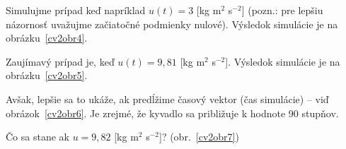 \documentclass[a4paper, 10pt, ]{article}
\begin{document}
\bigskip

\noindent
Simulujme prípad keď napríklad $u(t) = 3$ [kg m$^2$ s$^{-2}$] (pozn.: pre lepšiu názornosť uvažujme začiatočné podmienky nulové). Výsledok simulácie je na obrázku~\ref{cv2obr4}.
\begin{center}


    \vspace{-3mm}

	\label{cv2obr4}


\end{center}



Zaujímavý prípad je, keď $u(t) = 9,81$ [kg m$^2$ s$^{-2}$]. Výsledok simulácie je na obrázku~\ref{cv2obr5}.
\begin{center}


    \vspace{-3mm}

	\label{cv2obr5}


\end{center}
Avšak, lepšie sa to ukáže, ak predĺžime časový vektor (čas simulácie) -- viď obrázok~\ref{cv2obr6}. Je zrejmé, že kyvadlo sa približuje k hodnote 90 stupňov.
\begin{center}


    \vspace{-3mm}

	\label{cv2obr6}


\end{center}


Čo sa stane ak $u = 9,82$ [kg m$^2$ s$^{-2}$]? (obr.~\ref{cv2obr7})
\begin{center}


    \vspace{-3mm}

	\label{cv2obr7}


\end{center}
\end{document}
